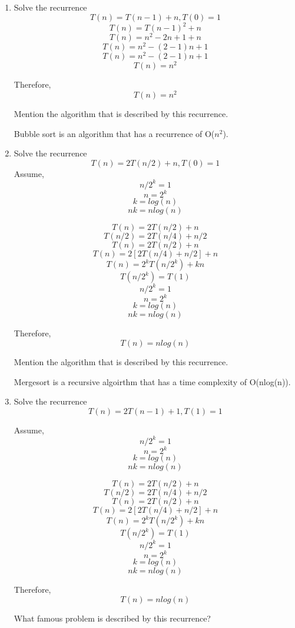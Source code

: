 \documentclass{article}
\begin{document}
\begin{enumerate}
    \item Solve the recurrence
            \[ T(n) = T(n-1) + n, T(0) = 1 \]
            \[ T(n) = T(n-1)^2 + n\]
            \[ T(n) = n^2 -2n + 1 + n\]
            \[ T(n) = n^2 - (2-1)n + 1\]
            \[ T(n) = n^2 - (2-1)n + 1\]
            \[T(n) = n^2\]

            Therefore, \[T(n) = n^2\]

            Mention the algorithm that is described by this recurrence.

            Bubble sort is an algorithm that has a recurrence of O($n^2$).
    \item Solve the recurrence
            \[ T(n) = 2T(n/2) + n, T(0) = 1\]
            Assume,
            \[ n/2^k = 1\]
            \[ n = 2^k\]
            \[ k = log(n)\]
            \[ nk = nlog(n)\]

            \[ T(n) = 2T(n/2) + n \]
            \[ T(n/2) = 2T(n/4) + n/2 \]
            \[ T(n) = 2T(n/2) + n \]
            \[ T(n) = 2[2T(n/4) + n/2] + n \]
            \[ T(n) = 2^kT(n/2^k) + kn \]
            \[ T(n/2^k) = T(1)\]
            \[ n/2^k = 1\]
            \[ n = 2^k\]
            \[ k = log(n)\]
            \[ nk = nlog(n)\]

            Therefore, \\
            \[T(n) = nlog(n)\]

            Mention the algorithm that is described by this recurrence.

            Mergesort is a recursive algoirthm that has a time complexity of O(nlog(n)).
    \item Solve the recurrence
            \[ T(n) = 2T(n-1) + 1, T(1) = 1 \]

            Assume,
            \[ n/2^k = 1\]
            \[ n = 2^k\]
            \[ k = log(n)\]
            \[ nk = nlog(n)\]

            \[ T(n) = 2T(n/2) + n \]
            \[ T(n/2) = 2T(n/4) + n/2 \]
            \[ T(n) = 2T(n/2) + n \]
            \[ T(n) = 2[2T(n/4) + n/2] + n \]
            \[ T(n) = 2^kT(n/2^k) + kn \]
            \[ T(n/2^k) = T(1)\]
            \[ n/2^k = 1\]
            \[ n = 2^k\]
            \[ k = log(n)\]
            \[ nk = nlog(n)\]

            Therefore, \\
            \[T(n) = nlog(n)\]
            
            What famous problem is described by this recurrence?
\end{enumerate}
\end{document}
